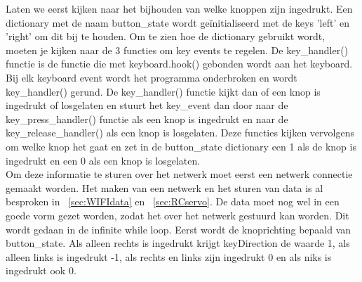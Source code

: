 Laten we eerst kijken naar het bijhouden van welke knoppen zijn ingedrukt. Een dictionary met de naam button\_state wordt ge\"initialiseerd met de keys 'left' en 'right' om dit bij te houden. Om te zien hoe de dictionary gebruikt wordt, moeten je kijken naar de 3 functies om key events te regelen. De key\_handler() functie is de functie die met keyboard.hook() gebonden wordt aan het keyboard. Bij elk keyboard event wordt het programma onderbroken en wordt key\_handler() gerund. De key\_handler() functie kijkt dan of een knop is ingedrukt of losgelaten en stuurt het key\_event dan door naar de key\_press\_handler() functie als een knop is ingedrukt en naar de key\_release\_handler() als een knop is losgelaten. Deze functies kijken vervolgens om welke knop het gaat en zet in de button\_state dictionary een 1 als de knop is ingedrukt en een 0 als een knop is losgelaten. \\

Om deze informatie te sturen over het netwerk moet eerst een netwerk connectie gemaakt worden. Het maken van een netwerk en het sturen van data is al besproken in ~\ref{sec:WIFIdata} en ~\ref{sec:RCservo}. De data moet nog wel in een goede vorm gezet worden, zodat het over het netwerk gestuurd kan worden. Dit wordt gedaan in de infinite while loop. Eerst wordt de knoprichting bepaald van button\_state. Als alleen rechts is ingedrukt krijgt keyDirection de waarde 1, als alleen links is ingedrukt -1, als rechts en links zijn ingedrukt 0 en als niks is ingedrukt ook 0. \\

